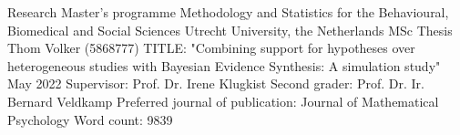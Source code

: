
\thispagestyle{empty}

\begin{large}
\noindent Research Master's programme 
Methodology and Statistics for the Behavioural, Biomedical and Social Sciences \newline
Utrecht University, the Netherlands \newline
\newline
\newline
\newline
\newline
MSc Thesis Thom Volker (5868777) 
\newline
TITLE: "Combining support for hypotheses over heterogeneous studies with Bayesian Evidence Synthesis: A simulation study" 
\newline
May 2022 
\newline
\newline
\newline
\newline
\newline
Supervisor:\newline
Prof. Dr. Irene Klugkist \newline
\newline
\newline
Second grader: \newline
Prof. Dr. Ir. Bernard Veldkamp
\newline
\newline
\newline
\newline
Preferred journal of publication: Journal of Mathematical Psychology 
\newline
Word count: 9839
\newline
\end{large}
\addtocounter{page}{-1}
\clearpage
\pagebreak
